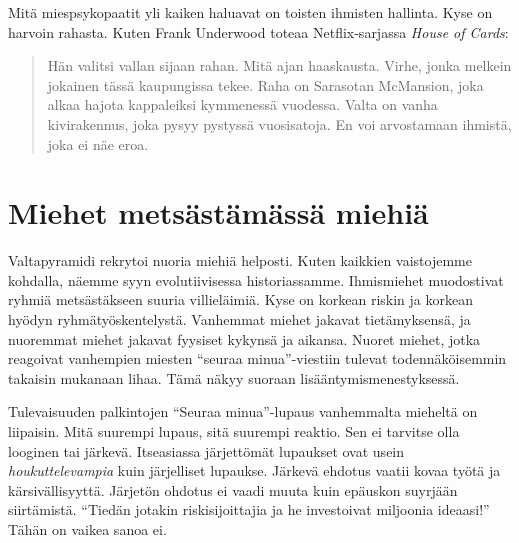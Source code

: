 Mitä miespsykopaatit yli kaiken haluavat on toisten ihmisten hallinta. Kyse on harvoin rahasta. Kuten Frank Underwood toteaa Netflix-sarjassa \emph{House of Cards}:
\begin{quotation}
\noindent Hän valitsi vallan sijaan rahan. Mitä ajan haaskausta. Virhe, jonka melkein jokainen tässä kaupungissa tekee. Raha on Sarasotan McMansion, joka alkaa hajota kappaleiksi kymmenessä vuodessa. Valta on vanha kivirakennus, joka pysyy pystyssä vuosisatoja. En voi arvostamaan ihmistä, joka ei näe eroa.
\end{quotation}

\section{Miehet metsästämässä miehiä}

Valtapyramidi rekrytoi nuoria miehiä helposti. Kuten kaikkien vaistojemme kohdalla, näemme syyn evolutiivisessa historiassamme. Ihmismiehet muodostivat ryhmiä metsästäkseen suuria villieläimiä. Kyse on korkean riskin ja korkean hyödyn ryhmätyöskentelystä. Vanhemmat miehet jakavat tietämyksensä, ja nuoremmat miehet jakavat fyysiset kykynsä ja aikansa. Nuoret miehet, jotka reagoivat vanhempien miesten ``seuraa minua''-viestiin tulevat todennäköisemmin takaisin mukanaan lihaa. Tämä näkyy suoraan lisääntymismenestyksessä.

Tulevaisuuden palkintojen ``Seuraa minua''-lupaus vanhemmalta mieheltä on liipaisin. Mitä suurempi lupaus, sitä suurempi reaktio. Sen ei tarvitse olla looginen tai järkevä. Itseasiassa järjettömät lupaukset ovat usein \emph{houkuttelevampia} kuin järjelliset lupaukse. Järkevä ehdotus vaatii kovaa työtä ja kärsivällisyyttä. Järjetön ohdotus ei vaadi muuta kuin epäuskon suyrjään siirtämistä. ``Tiedän jotakin riskisijoittajia ja he investoivat miljoonia ideaasi!'' Tähän on vaikea sanoa ei.

